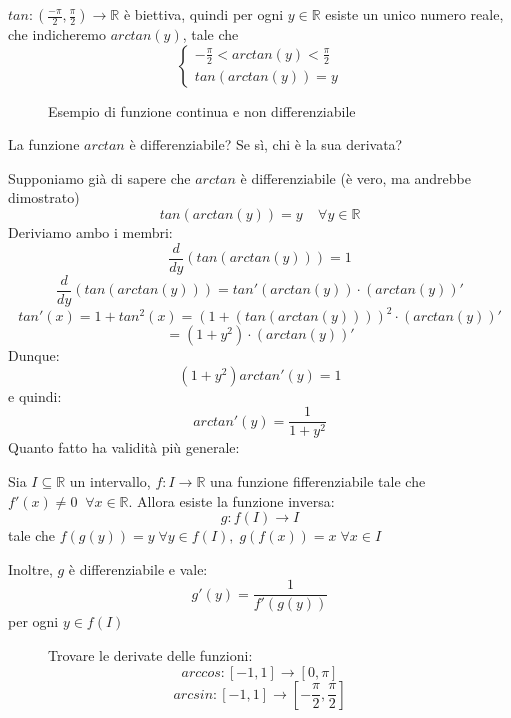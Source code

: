 \documentclass[a4paper]{article}
\theoremstyle{break}
\theoremstyle{break}
\theoremstyle{break}
\theoremstyle{break}
\begin{document}
\( tan: (\frac{-\pi}{2}, \frac{\pi}{2}) \to \mathbb{R} \) è biettiva, quindi per ogni \( y \in \mathbb{R} \)
esiste un unico numero reale, che indicheremo \( arctan(y) \), tale che
\[
  \begin{cases}
    -\frac{\pi}{2} < arctan(y) < \frac{\pi}{2}\\
    tan(arctan(y)) = y
  \end{cases}
\] 
 		\begin{figure}[H]
			\begin{center}
			\end{center}
      \caption{Esempio di funzione continua e non differenziabile}
		\end{figure}

La funzione \( arctan \) è differenziabile? Se sì, chi è la sua derivata?

Supponiamo già di sapere che \( arctan \) è differenziabile (è vero, ma andrebbe dimostrato)
\[
tan(arctan(y)) = y \;\;\;\;\forall y \in \mathbb{R}
\] 
Deriviamo ambo i membri:
\[
\frac{d}{dy}(tan(arctan(y))) = 1
\] 
\[
\frac{d}{dy}(tan(arctan(y)))= tan'(arctan(y)) \cdot (arctan(y))'
\] 
\[
tan'(x) = 1 + tan^2(x) = (1 + (tan(arctan(y))))^2 \cdot  (arctan(y))'
\] 
\[
= (1+y^2) \cdot (arctan(y))'
\] 
Dunque:
\[
  (1+y^2)arctan'(y) = 1
\] 
e quindi:
\[
arctan'(y) = \frac{1}{1+y^2}
\] 
Quanto fatto ha validità più generale:

Sia \( I \subseteq \mathbb{R} \) un intervallo, \( f: I \to \mathbb{R} \) una funzione
fifferenziabile tale che \( f'(x) \neq 0\;\; \forall x \in \mathbb{R}  \).
Allora esiste la funzione inversa:
\[
g: f(I) \to I
\] 
tale che \( f(g(y))=y\; \forall y \in f(I),\; g(f(x)) = x\; \forall x \in I \)

Inoltre, \( g \) è differenziabile e vale:
\[
g'(y) = \frac{1}{f'(g(y))}
\] 
per ogni \( y \in f(I) \) 

\begin{figure}[H]
  \begin{exercise}
    Trovare le derivate delle funzioni:
    \[
    arccos: [-1,1] \to [0,\pi]
    \] 
    \[
    arcsin: [-1,1] \to [-\frac{\pi}{2}, \frac{\pi}{2}]
    \] 
  \end{exercise}
\end{figure}
\end{document}
